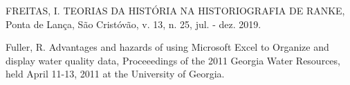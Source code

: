 \documentclass[
12pt,		%
openright,	%
twoside,  %
a4paper,			%
chapter=TITLE,		%
english,			%
french,				%
spanish,			%
brazil				%
]{USPSC-classe/USPSC}
\begin{document}
\begin{flushleft}
\begin{flushleft}
\begin{flushleft}
\begin{flushleft}
\begin{flushleft}
\begin{flushleft}
\begin{flushleft}
\begin{flushleft}
\begin{flushleft}
[FREITAS, 2019] FREITAS, I. TEORIAS DA HIST\'ORIA NA HISTORIOGRAFIA DE RANKE, Ponta de Lan\c{c}a, S\~ao Crist\'ov\~ao, v. 13, n. 25, jul. - dez. 2019.
\end{flushleft}


\end{flushleft}


\end{flushleft}


\end{flushleft}


\end{flushleft}


\end{flushleft}


\end{flushleft}


\end{flushleft}


\end{flushleft}


\begin{flushleft}
\begin{flushleft}
\begin{flushleft}
\begin{flushleft}
\begin{flushleft}
\begin{flushleft}
\begin{flushleft}
\begin{flushleft}
\begin{flushleft}
[FULLER, 2011] Fuller, R. Advantages and hazards of using Microsoft Excel to Organize and display water quality data, Proceeedings of the 2011 Georgia Water Resources, held April 11-13, 2011 at the University of Georgia.
\end{flushleft}


\end{flushleft}


\end{flushleft}


\end{flushleft}


\end{flushleft}


\end{flushleft}


\end{flushleft}


\end{flushleft}


\end{flushleft}
\end{document}

